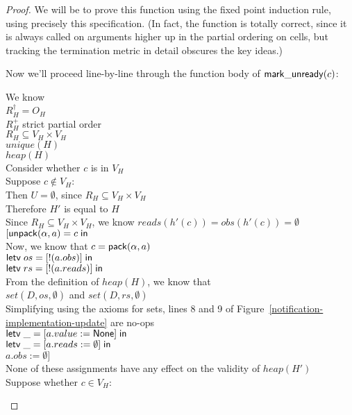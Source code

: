 \begin{proof}
We will be to prove this function using the fixed point induction
rule, using precisely this specification. (In fact, the function is
totally correct, since it is always called on arguments higher up in
the partial ordering on cells, but tracking the termination metric in
detail obscures the key ideas.)

Now we'll proceed line-by-line through the function body of $\mathsf{mark\_unready}(c)$: 

\begin{tabbedproof}
\oo We know \\
\oox $R^\dagger_H = O_H$ \\
\oox $R^+_H$ strict partial order \\
\oox $R_H \subseteq V_H \times V_H$ \\
\oox $\mathit{unique}(H)$ \\
\oox $\mathit{heap}(H)$ \\
\ooo Consider whether $c$ is in $V_H$ \\
\ooo Suppose $c \not\in V_H$: \\
\oooo Then $U = \emptyset$, since $R_H \subseteq V_H \times V_H$ \\ 
\oooo Therefore $H'$ is equal to $H$ \\
\oooo Since $R_H \subseteq V_H \times V_H$, we know $\mathit{reads}(h'(c)) = \mathit{obs}(h'(c)) = \emptyset$ \\
\oooo $[\mathsf{unpack}({\alpha}, {a}) = {c} \;\mathsf{in}\;{}$ \\
\oooo Now, we know that $c = \mathsf{pack}({\alpha}, {a})$ \\
\oooo $\mathsf{letv}\;os = [!(a.obs)]\;\mathsf{in}\;$ \\
\oooo $\mathsf{letv}\;rs = [!(a.reads)]\;\mathsf{in}\;$ \\
\oooo From the definition of $\mathit{heap}(H)$, we know that  \\
\oooo $\mathit{set}(D, os, \emptyset)$ and $\mathit{set}(D, rs, \emptyset)$ \\
\oooo Simplifying using the axioms for sets, lines 8 and 9 of Figure~\ref{notification-implementation-update} are no-ops \\
\oooo $\mathsf{letv}\;\_ = [a.value := \mathsf{None}]\;\mathsf{in}\;$ \\
\oooo $\mathsf{letv}\;\_ = [a.reads := \emptyset]\;\mathsf{in}\;$ \\
\oooo $a.obs := \emptyset]$ \\
\oooo None of these assignments have any effect on the validity of $\mathit{heap}(H')$ \\
\ooo Suppose whether $c \in V_H$: \\

\end{tabbedproof}
\end{proof}
